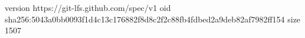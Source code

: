 version https://git-lfs.github.com/spec/v1
oid sha256:5043a0bb0093f1d4c13c176882f8d8c2f2c88fb4fdbed2a9deb82af7982ff154
size 1507
